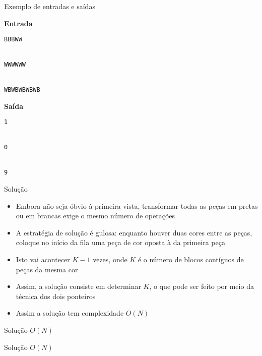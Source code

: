 \begin{frame}[fragile]{Exemplo de entradas e saídas}

\begin{minipage}[t]{0.45\textwidth}
\textbf{Entrada}
\begin{verbatim}
BBBWW


WWWWWW


WBWBWBWBWB
\end{verbatim}
\end{minipage}
\begin{minipage}[t]{0.5\textwidth}
\textbf{Saída}
\begin{verbatim}
1


0


9
\end{verbatim}
\end{minipage}
\end{frame}

\begin{frame}[fragile]{Solução}

    \begin{itemize}
        \item Embora não seja óbvio à primeira vista, transformar todas as peças em pretas
            ou em brancas exige o mesmo número de operações

        \item A estratégia de solução é gulosa: enquanto houver duas cores entre as peças,
            coloque no início da fila uma peça de cor oposta à da primeira peça

        \item Isto vai acontecer $K - 1$ vezes, onde $K$ é o número de blocos contíguos de
            peças da mesma cor

        \item Assim, a solução consiste em determinar $K$, o que pode ser feito por meio da
            técnica dos dois ponteiros

        \item Assim a solução tem complexidade $O(N)$
    
    \end{itemize}

\end{frame}

\begin{frame}[fragile]{Solução $O(N)$}
\end{frame}

\begin{frame}[fragile]{Solução $O(N)$}
\end{frame}
